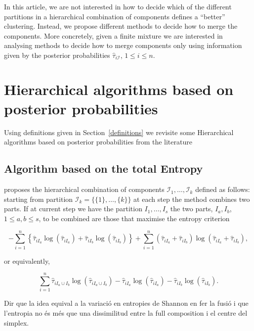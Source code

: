 \documentclass[10pt, a4paper]{article}
\begin{document}
In this article, we are not interested in how to decide which of the different partitions in a hierarchical combination of components defines a ``better'' clustering. Instead, we propose different methods to decide how to merge the components. More concretely, given a finite mixture we are interested in analysing methods to decide how to merge components only using information given by the posterior probabilities $\hat{\tau}_{i \mathcal{I}}$, $1\leq i \leq n$.


\section{Hierarchical algorithms based on posterior probabilities}

Using definitions given in Section~\ref{definitions} we revisite some Hierarchical algorithms based on posterior probabilities from the literature

\subsection*{Algorithm based on the total Entropy}


\cite{baudry2010combining} proposes the  hierarchical combination of components  $\mathcal{I}_1, \dots, \mathcal{I}_k$ defined as follows: starting from partition $\mathcal{I}_k = \{\{1\},\dots, \{k\}\}$ at each step the method combines two parts. If at current step we have the partition  $I_1, \dots, I_s$ the two parts, $I_a, I_b$, $1 \leq a,b \leq s$, to be combined are those that maximise the entropy criterion

\[
- \sum_{i=1}^n \left\{ \hat{\tau}_{iI_a} \log(\hat{\tau}_{iI_a}) + \hat{\tau}_{iI_b} \log(\hat{\tau}_{iI_b})\right\} +  \sum_{i=1}^n  (\hat{\tau}_{iI_a}+\hat{\tau}_{iI_b}) \log(\hat{\tau}_{iI_a} + \hat{\tau}_{iI_b}),
\]

or equivalently,

\[
 \sum_{i=1}^n \hat{\tau}_{i I_a \cup I_b} \log(\hat{\tau}_{i I_a \cup I_b}) - \hat{\tau}_{iI_a} \log(\hat{\tau}_{iI_a}) - \hat{\tau}_{iI_b} \log(\hat{\tau}_{iI_b}).
\]

{\color{red} Dir que la idea equival a la variació en entropies de Shannon en fer la fusió  i que l'entropia no és més que una dissimilitud entre la full composition i el centre del simplex.}
\end{document}
